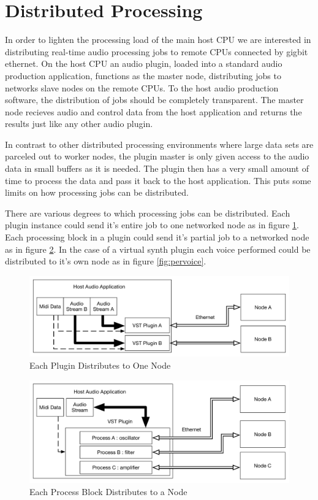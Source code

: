 \section{Distributed Processing}

In order to lighten the processing load of the main host CPU we are interested in distributing real-time audio processing jobs to remote CPUs connected by gigbit ethernet. On the host CPU an audio plugin, loaded into a standard audio production application, functions as the master node, distributing jobs to networks slave nodes on the remote CPUs. To the host audio production software, the distribution of jobs should be completely transparent. The master node recieves audio and control data from the host application and returns the results just like any other audio plugin.

In contrast to other distributed processing environments where large data sets are parceled out to worker nodes, the plugin master is only given access to the audio data in small buffers as it is needed. The plugin then has a very small amount of time to process the data and pass it back to the host application. This puts some limits on how processing jobs can be distributed.

There are various degrees to which processing jobs can be distributed. Each plugin instance could send it's entire
job to one networked node as in figure \ref{fig:one_to_one}. Each processing block in a plugin could send it's
partial job to a networked node as in figure \ref{fig:perproccessor}. In the case of a virtual synth plugin each
voice performed could be distributed to it's own node as in figure \ref{fig:pervoice}.

\begin{figure}[H]
    \centering
    \includegraphics[width=\textwidth]{assets/distribution_1to1.pdf}
    \caption{Each Plugin Distributes to One Node}
    \label{fig:one_to_one}
\end{figure}

\begin{figure}[H]
    \centering
    \includegraphics[width=\textwidth]{assets/distribution_perprocessor.pdf}
    \caption{Each Process Block Distributes to a Node}
    \label{fig:perproccessor}
\end{figure}

